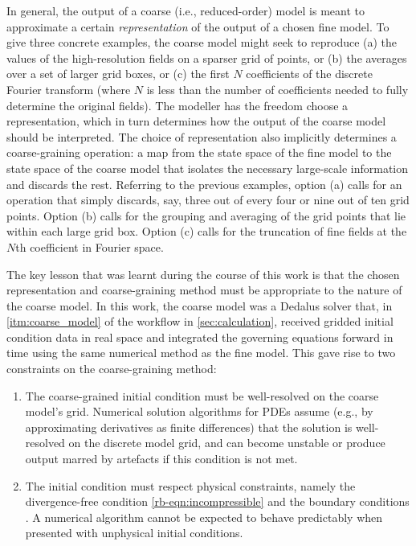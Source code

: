 \documentclass[../main.tex]{subfiles}
\begin{document}
In general, the output of a coarse (i.e., reduced-order) model is meant to
approximate a certain \emph{representation} of the output of a chosen fine
model. To give three concrete examples, the coarse model might seek to
reproduce (a) the values of the high-resolution fields on a sparser grid of
points, or (b) the averages over a set of larger grid boxes, or (c) the first
$N$ coefficients of the discrete Fourier transform (where $N$ is less than the
number of coefficients needed to fully determine the original fields). The
modeller has the freedom choose a representation, which in turn determines how
the output of the coarse model should be interpreted. The choice of
representation also implicitly determines a coarse-graining operation: a map
from the state space of the fine model to the state space of the coarse model
that isolates the necessary large-scale information and discards the rest.
Referring to the previous examples, option (a) calls for an operation that
simply discards, say, three out of every four or nine out of ten grid points.
Option (b) calls for the grouping and averaging of the grid points that lie
within each large grid box. Option (c) calls for the truncation of fine fields
at the $N$th coefficient in Fourier space.

The key lesson that was learnt during the course of this work is that the
chosen representation and coarse-graining method must be appropriate to the
nature of the coarse model. In this work, the coarse model was a Dedalus solver
that, in \cref{itm:coarse_model} of the workflow in \cref{sec:calculation},
received gridded initial condition data in real space and integrated the
governing equations forward in time using the same numerical method as the
fine model. This gave rise to two constraints on the coarse-graining method:
\begin{enumerate}
    \item The coarse-grained initial condition must be well-resolved on the
        coarse model's grid. Numerical solution algorithms for PDEs assume
        (e.g., by approximating derivatives as finite differences) that the
        solution is well-resolved on the discrete model grid, and can become
        unstable or produce output marred by artefacts if this condition is not
        met.
    \item The initial condition must respect physical constraints, namely the
        divergence-free condition \cref{rb-eqn:incompressible} and the boundary
        conditions . A numerical
        algorithm cannot be expected to behave predictably when presented with
        unphysical initial conditions.
\end{enumerate}
\end{document}
